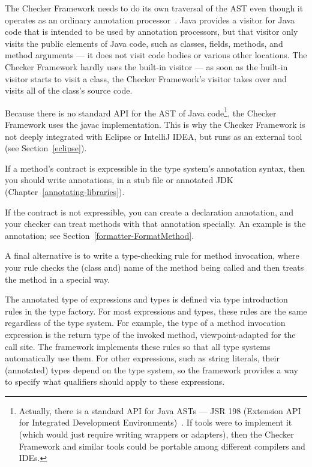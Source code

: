 
The Checker Framework needs to do its own traversal of the AST even though
it operates as an ordinary annotation processor~\cite{JSR269}.  Java
provides a visitor for Java code that is intended to be used by annotation
processors, but that visitor only
visits the public elements of Java code, such as classes, fields, methods,
and method arguments --- it does not visit code bodies or various other
locations.  The Checker Framework hardly uses the built-in visitor --- as
soon as the built-in visitor starts to visit a class, the Checker
Framework's visitor takes over and visits all of the class's source code.

Because there is no standard API for the AST of Java
code\footnote{Actually, there is a standard API for Java ASTs --- JSR 198
  (Extension API for Integrated Development Environments)~\cite{JSR198}.
  If tools were to implement it (which would just require writing wrappers
  or adapters), then the Checker Framework and similar tools could be
  portable among different compilers and IDEs.}, the Checker Framework uses
the javac implementation.  This is why the Checker Framework is not deeply
integrated with Eclipse or IntelliJ IDEA, but runs as an external tool (see
Section~\ref{eclipse}).



If a method's contract is expressible in the type system's annotation
syntax, then you should write annotations, in a stub file or annotated JDK
(Chapter~\ref{annotating-libraries}).

If the contract is not expressible, you can create a declaration
annotation, and your checker can treat methods with that annotation
specially.  An example is the
 annotation; see
Section~\ref{formatter-FormatMethod}.

A final alternative is to write a type-checking rule for method invocation,
where your rule checks the (class and) name of the method
being called and then treats the method in a special way.



The annotated type of expressions and types is defined via type introduction rules in the
type factory.  For most expressions and types, these rules are the same regardless of the type system.
For example, the type of a method invocation expression is the return type of the invoked method,
viewpoint-adapted for the call site.  The framework implements these rules so that all type systems
automatically use them.  For other expressions, such as string literals, their (annotated) types depend
on the type system, so the framework provides a way to specify what qualifiers should apply to these expressions.

